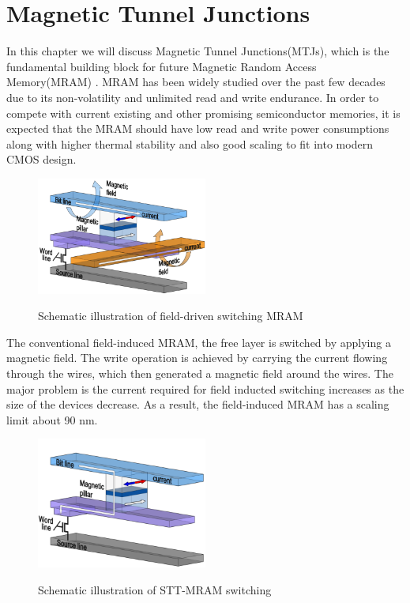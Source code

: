 \section{Magnetic Tunnel Junctions}

In this chapter we will discuss Magnetic Tunnel Junctions(MTJs), which is the fundamental building block for future Magnetic Random Access Memory(MRAM)\cite{MTJZhu} . MRAM has been widely studied over the past few decades due to its non-volatility and unlimited read and write endurance\cite{MRAMdevelop}. In order to compete with current existing and other promising semiconductor memories, it is expected that the MRAM should have low read and write power consumptions along with higher thermal stability and also good scaling to fit into modern CMOS design. 

\begin{figure}[h!]
\centering
\includegraphics[width=0.5\textwidth]{fig/MTJ/fieldMTJ.png}
\label{fig:fieldMTJ}
\caption{Schematic illustration of field-driven switching MRAM}
\end{figure}

The conventional field-induced MRAM, the free layer is switched by applying a magnetic field\cite{MRAMDevelopment1}. The write operation is achieved by carrying the current flowing through the wires, which then generated a magnetic field around the wires. The major problem is the current required for field inducted switching increases as the size of the devices decrease. As a result, the field-induced MRAM has a scaling limit about 90 nm.

 
\begin{figure}[h!]
\centering
\includegraphics[width=0.5\textwidth]{fig/MTJ/STTMTJ.png}
\label{fig:STTMTJ}
\caption{ Schematic illustration of STT-MRAM switching}
\end{figure}


